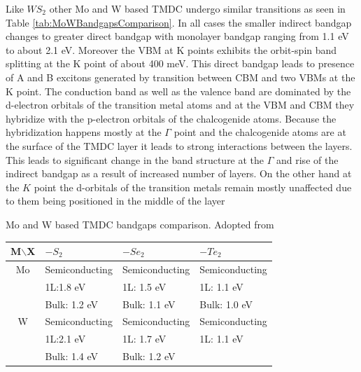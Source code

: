 	Like $WS_2$ other Mo and W based TMDC undergo similar transitions as seen in Table \ref{tab:MoWBandgapsComparison}. In all cases the smaller indirect bandgap changes to greater direct bandgap with monolayer bandgap ranging from 1.1 eV to about 2.1 eV. Moreover the VBM at K points exhibits the orbit-spin band splitting at the K point of about 400 meV. This direct bandgap leads to presence of A and B excitons generated by transition between CBM and two VBMs at the K point. The conduction band as well as the valence band are dominated by the d-electron orbitals of the transition metal atoms and at the VBM and CBM they hybridize with the p-electron orbitals of the chalcogenide atoms. Because the hybridization happens mostly at the $\Gamma$ point and the chalcogenide atoms are at the surface of the TMDC layer it leads to strong interactions between the layers. This leads to significant change in the band structure at the $\Gamma$ and rise of the indirect bandgap as a result of increased number of layers. On the other hand at the $K$ point the d-orbitals of the transition metals remain mostly unaffected due to them being positioned in the middle of the layer \cite{WS2BandStructureSimulation} \cite{EmergingPhotoluminescenceInMonolayerMoS2}
	 
	 \begin{table}[h]
	 \caption{Mo and W based TMDC bandgaps comparison. Adopted from \cite{ElectronicsAndOptoelectronicsOfTwo-dimensionalTransitionMetalDichalcogenides}}
	 \label{tab:MoWBandgapsComparison}
	 \end{table}
	 
	 \begin{center}
	 \begin{tabular}{c|l|l|l}
	 
	 M$\backslash$X & $-S_2$ 			& $-Se_2$ 			& $-Te_2$			\\ \hline
	 Mo 			& Semiconducting	& Semiconducting	& Semiconducting	\\ 
	 				& 1L:1.8 eV			& 1L: 1.5 eV		& 1L: 1.1 eV		\\
	 				& Bulk: 1.2 eV		& Bulk: 1.1 eV		& Bulk: 1.0 eV		\\ \hline
	 W 				& Semiconducting	& Semiconducting	& Semiconducting	\\
	 				& 1L:2.1 eV			& 1L: 1.7 eV		& 1L: 1.1 eV		\\
	 				& Bulk: 1.4 eV		& Bulk: 1.2 eV		& 					\\
	 
	 \end{tabular}
	 \end{center}
	

